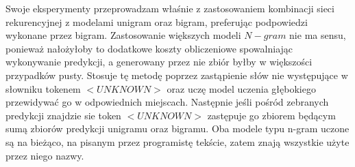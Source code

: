 \begin{description}
Swoje eksperymenty przeprowadzam właśnie z zastosowaniem kombinacji sieci rekurencyjnej z modelami unigram oraz bigram, preferując podpowiedzi wykonane przez bigram. Zastosowanie 
większych modeli \begin{math}N-gram\end{math} nie ma sensu, ponieważ nałożyłoby to dodatkowe koszty obliczeniowe spowalniając wykonywanie predykcji, a generowany przez nie zbiór 
byłby w większości przypadków pusty. 
Stosuje tę metodę poprzez zastąpienie słów nie występujące w słowniku tokenem \begin{math}<UNKNOWN>\end{math} oraz uczę model uczenia głębokiego przewidywać go w odpowiednich miejscach. Następnie jeśli pośród 
zebranych predykcji znajdzie sie token \begin{math}<UNKNOWN>\end{math} zastępuje go zbiorem będącym sumą zbiorów predykcji unigramu oraz bigramu. Oba modele typu n-gram uczone są na bieżąco,
na pisanym przez programistę tekście, zatem znają wszystkie użyte przez niego nazwy. \\


\end{description}
